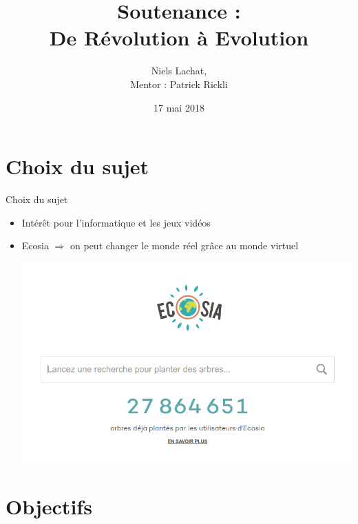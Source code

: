 \documentclass[11pt]{beamer}
\author{Niels Lachat, \\ Mentor : Patrick Rickli}
\title{Soutenance : \\ De Révolution à Evolution}
\institute{Lycée Denis-de-Rougemont}
\date{17 mai 2018}
\newcommand{\pauseditemize}{\pause \begin{itemize}[<+->]}
\begin{document}
\begin{frame}
\titlepage
\end{frame}

\begin{frame}
\tableofcontents
\end{frame}

\section{Choix du sujet}

\begin{frame}{Choix du sujet}

\pauseditemize
	\item Intérêt pour l'informatique et les jeux vidéos
	\item Ecosia $\Rightarrow$ on peut changer le monde réel grâce au monde virtuel
	\begin{center}
		\includegraphics[scale=.25]{../images/ecosia}
	\end{center}
\end{itemize}

\end{frame}

\section{Objectifs}
\end{document}
